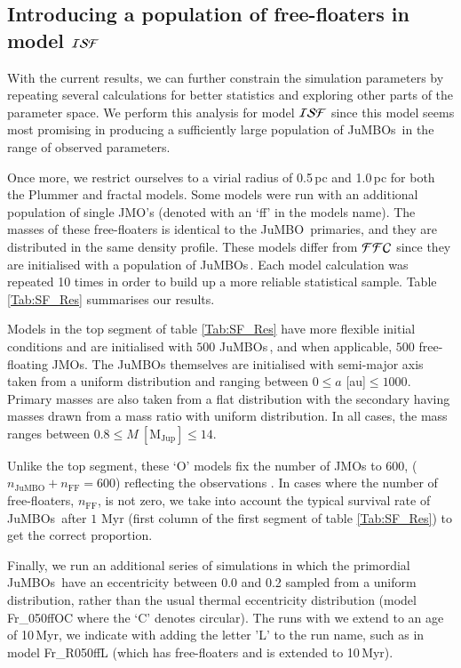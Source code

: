 \documentclass[submission,phys]{lib/SciPost}
\newcommand{\jumbo}{\mbox{JuMBO}}
\newcommand{\jumbos}{\mbox{JuMBOs}}
\begin{document}
\subsection{Introducing a population of free-floaters in model ${\cal ISF}$}\label{sect:ISF_explored}

With the current results, we can further constrain the simulation
parameters by repeating several calculations for better statistics and
exploring other parts of the parameter space.  We perform this
analysis for model ${\cal ISF}$ since this model seems most
promising in producing a sufficiently large population of \jumbos\,
in the range of observed parameters.

Once more, we restrict ourselves to a virial radius of 0.5\,pc and
1.0\,pc for both the Plummer and fractal models. Some models
were run with an additional population of single JMO's (denoted with an 
`ff' in the models name). The masses of these free-floaters is 
identical to the \jumbo\, primaries, and they are distributed in the same 
density profile. These models differ from ${\cal FFC}$ since they are 
initialised with a population of \jumbos\,. Each model calculation was 
repeated 10 times in order to build up a more reliable statistical sample. 
Table \ref{Tab:SF_Res} summarises our results.

Models in the top segment of table \ref{Tab:SF_Res} have more flexible
initial conditions and are initialised with $500$ \jumbos\,, and when
applicable, $500$ free-floating JMOs. The JuMBOs themselves are
initialised with semi-major axis taken from a uniform distribution and
ranging between $0\leq a$ [au]$\leq 1000$. Primary masses are also
taken from a flat distribution with the secondary having masses drawn
from a mass ratio with uniform distribution. In all cases, the mass
ranges between $0.8\leq M\ [\mathrm{M_{Jup}}]\leq 14$.

Unlike the top segment, these `O' models fix the number of JMOs to
$600$, ($n_{\mathrm{\jumbo}} + n_{\mathrm{FF}} = 600$) reflecting the
observations \cite{2023arXiv231001231P}. In cases where the number of
free-floaters, $n_{\mathrm{FF}}$, is not zero, we take into account
the typical survival rate of \jumbos\ after $1$ Myr (first column of
the first segment of table \ref{Tab:SF_Res}) to get the correct
proportion.

Finally, we run an additional series of simulations in which the
primordial \jumbos\, have an eccentricity between 0.0 and 0.2 sampled
from a uniform distribution, rather than the usual thermal
eccentricity distribution (model Fr\_050ffOC where the `C' denotes
circular).  The runs with we extend to an age of 10\,Myr, we indicate
with adding the letter 'L' to the run name, such as in model
Fr\_R050ffL (which has free-floaters and is extended to 10\,Myr).
\end{document}
